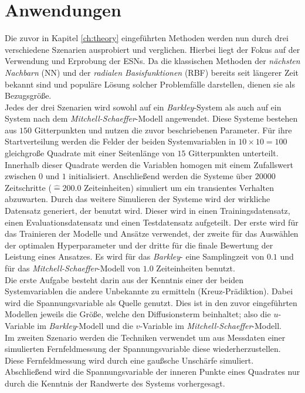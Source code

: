 \chapter{Anwendungen}
\label{ch:experiments}

Die zuvor in Kapitel \ref{ch:theory} eingeführten Methoden werden nun durch drei verschiedene Szenarien ausprobiert und verglichen. Hierbei liegt der Fokus auf der Verwendung und Erprobung der \textsc{ESN}s. Da die klassischen Methoden der \textit{nächsten Nachbarn} (\textsc{NN}) und der \textit{radialen Basisfunktionen} (\textsc{RBF}) bereits seit längerer Zeit bekannt sind und populäre Lösung solcher Problemfälle darstellen, dienen sie als Bezugsgröße.\\

Jedes der drei Szenarien wird sowohl auf ein \textit{Barkley}-System als auch auf ein System nach dem \textit{Mitchell-Schaeffer}-Modell angewendet. Diese Systeme bestehen aus $150$ Gitterpunkten und nutzen die zuvor beschriebenen Parameter. Für ihre Startverteilung werden die Felder der beiden Systemvariablen in $10 \times 10 = 100$ gleichgroße Quadrate mit einer Seitenlänge von $15$ Gitterpunkten unterteilt. Innerhalb dieser Quadrate werden die Variablen homogen mit einem Zufallswert zwischen $0$ und $1$ initialisiert. Anschließend werden die Systeme über $20000$ Zeitschritte ($\widehat{=} 200.0$ Zeiteinheiten) simuliert um ein transientes Verhalten abzuwarten. Durch das weitere Simulieren der Systeme wird der wirkliche Datensatz generiert, der benutzt wird. Dieser wird in einen Trainingsdatensatz, einen Evaluationsdatensatz und einen Testdatensatz aufgeteilt. Der erste wird für das Trainieren der Modelle und Ansätze verwendet, der zweite für das Auswählen der optimalen Hyperparameter und der dritte für die finale Bewertung der Leistung eines Ansatzes. Es wird für das \textit{Barkley}- eine Samplingzeit von $0.1$ und für das \textit{Mitchell-Schaeffer}-Modell von $1.0$ Zeiteinheiten benutzt.\\
 
Die erste Aufgabe besteht darin aus der Kenntnis einer der beiden Systemvariablen die andere Unbekannte zu ermitteln (Kreuz-Prädiktion). Dabei wird die Spannungsvariable als Quelle genutzt. Dies ist in den zuvor eingeführten Modellen jeweils die Größe, welche den Diffusionsterm beinhaltet; also die $u$-Variable im \textit{Barkley}-Modell und die $v$-Variable im \textit{Mitchell-Schaeffer}-Modell.\\
Im zweiten Szenario werden die Techniken verwendet um aus Messdaten einer simulierten Fernfeldmessung der Spannungsvariable  diese wiederherzustellen. Diese Fernfeldmessung wird durch eine gaußsche Unschärfe simuliert.\\
Abschließend wird die Spannungsvariable der inneren Punkte eines Quadrates nur durch die Kenntnis der Randwerte des Systems vorhergesagt.\\

